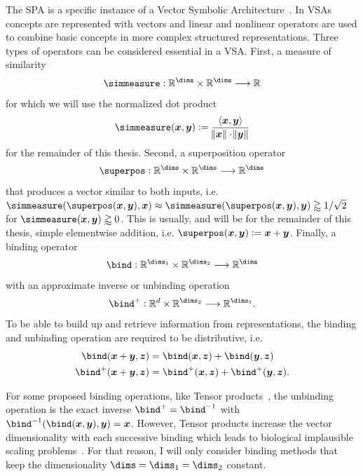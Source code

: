 The SPA is a specific instance of a Vector Symbolic Architecture~\parencite[VSA;][]{gayler_vector_2003}.
In VSAs concepts are represented with vectors and linear and nonlinear operators are used to combine basic concepts in more complex structured representations.
Three types of operators can be considered essential in a VSA\@.
First, a measure of similarity
\begin{equation}
    \simmeasure: \mathbb{R}^{\dims} \times \mathbb{R}^{\dims} \longrightarrow \mathbb{R}
\end{equation}
for which we will use the normalized dot product
\begin{equation}
    \simmeasure(\vc x, \vc y) := \frac{\left\langle \vc x, \vc y \right\rangle}{\norm{\vc x} \cdot \norm{\vc y}}
\end{equation}
for the remainder of this thesis.
Second, a superposition operator
\begin{equation}
    \superpos: \mathbb{R}^{\dims} \times \mathbb{R}^{\dims} \longrightarrow \mathbb{R}^{\dims}
\end{equation}
that produces a vector similar to both inputs, i.e.\ $\simmeasure(\superpos(\vc x, \vc y), \vc x) \approx \simmeasure(\superpos(\vc x, \vc y), \vc y) \gtrapprox 1/\sqrt{2}$ for $\simmeasure(\vc x, \vc y) \gtrapprox 0$.
This is usually, and will be for the remainder of this thesis, simple elementwise addition, i.e. $\superpos(\vc x, \vc y) := \vc x + \vc y$.
Finally, a binding operator
\begin{equation}
    \bind: \mathbb{R}^{\dims_1} \times \mathbb{R}^{\dims_2} \longrightarrow \mathbb{R}^{\dims}
\end{equation}
with an approximate inverse or unbinding operation
\begin{equation}
    \bind^+: \mathbb{R}^d \times \mathbb{R}^{\dims_2} \longrightarrow \mathbb{R}^{\dims_1} \text{.}
\end{equation}
To be able to build up and retrieve information from representations, the binding and unbinding operation are required to be distributive, i.e.
\begin{align}
    \bind(\vc x + \vc y, \vc z) &= \bind(\vc x, \vc z) + \bind(\vc y, \vc z) \\
    \bind^+(\vc x + \vc y, \vc z) &= \bind^+(\vc x, \vc z) + \bind^+(\vc y, \vc z) \text{.}
\end{align}

For some proposed binding operations, like Tensor products~\parencite{smolensky1990}, the unbinding operation is the exact inverse $\bind^+ = \bind^{-1}$ with $\bind^{-1}(\bind(\vc x, \vc y), \vc y) = \vc x$.
However, Tensor products increase the vector dimensionality with each successive binding which leads to biological implausible scaling problems~\parencite[Appendix D.5]{eliasmith2013}.
For that reason, I will only consider binding methods that keep the dimensionality $\dims = \dims_1 = \dims_2$ constant.

